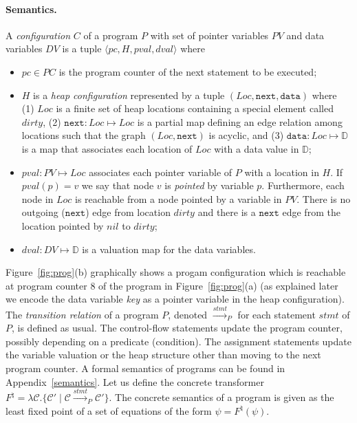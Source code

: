\documentclass{llncs}
\newcommand{\tuple}[1]{\langle #1 \rangle}
\newcommand{\next}{\texttt{next}}
\newcommand{\Loc}{\mathit{Loc}}
\newcommand{\PV}{\mathit{PV}}
\newcommand{\dom}{\mathbb{D}}
\newcommand{\DV}{\mathit{DV}}
\newcommand{\data}{\texttt{data}}
\newcommand{\pc}{\mathit{pc}}
\newcommand{\heap}{H}
\newcommand{\pval}{\mathit{pval}}
\newcommand{\dval}{\mathit{dval}}
\newcommand{\PC}{\mathit{PC}}
\newcommand{\dirty}{\mathit{dirty}}
\begin{document}
\paragraph{Semantics.} A {\em configuration} $C$ of a program $P$ with set of pointer variables $\PV$ and data variables $\DV$ is a tuple $\tuple{\pc, \heap, \pval, \dval}$ where
\begin{itemize}
\item $\pc\in\PC$ is the program counter of the next statement to be executed;

\item $H$ is a {\em heap configuration} represented by a tuple $(\Loc, \next, \data)$ where (1) $\Loc$ is a finite set of heap locations containing a special element called $\dirty$, (2) $\next: \Loc \mapsto \Loc$ is a partial map defining an edge relation among locations such that the graph $(\Loc,\next)$ is acyclic, and (3) $\data:\Loc \mapsto \dom$ is a  map that associates each location of $\Loc$ with a data value in $\dom$;
\item $\pval:\PV\mapsto \Loc$ associates each pointer variable of $P$ with a location in $H$. If $\pval(p)=v$ we say that node $v$ is {\em pointed} by variable $p$. Furthermore, each node in $\Loc$ is reachable from a node pointed by a variable in $\PV$. There is no outgoing ($\next$) edge from location $\dirty$ and there is a $\next$ edge from the location pointed by $nil$ to $\dirty$;
\item $\dval:\DV \mapsto\dom$ is a valuation map for the data variables.
\end{itemize}


Figure~\ref{fig:prog}(b) graphically shows a progam configuration which is reachable at program counter $8$ of the program in Figure~\ref{fig:prog}(a) (as explained later we encode the data variable \emph{key} as a pointer variable in the heap configuration).
The {\em transition relation} of a program $P$, denoted $\xrightarrow{\mathit{stmt}}_P$ for each statement $\mathit{stmt}$ of $P$, is defined as usual.  The control-flow statements update the program counter, possibly depending on a predicate (condition).
The assignment statements update the variable valuation or the heap structure other than moving to the next program counter. A formal semantics of programs can be found in Appendix~\ref{semantics}.
Let us define the concrete transformer $F^\natural = \lambda \mathcal{C}. \{ \mathcal{C'} \mid \mathcal{C} \xrightarrow{\mathit{stmt}}_P \mathcal{C'} \}$. The concrete semantics of a program is given as the least fixed point of a set of equations of the form $\psi = F^\natural (\psi)$. 
\end{document}
